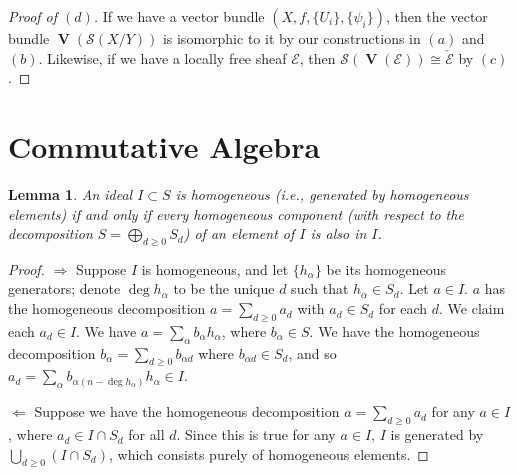 \documentclass[12pt,letterpaper]{article}
\newtheorem{lemma}{Lemma}[section]
\theoremstyle{definition}
\theoremstyle{remark}
\numberwithin{equation}{section}
\numberwithin{figure}{problem}
\DeclareMathOperator{\V}{\mathbf{V}}
\newcommand{\EE}{\mathscr{E}}
\newcommand{\Ss}{\mathscr{S}}
\begin{document}
\begin{proof}[Proof of $(d)$]
  If we have a vector bundle $(X,f,\{U_i\},\{\psi_i\})$, then the vector bundle $\V(\Ss(X/Y))$ is isomorphic to it by our constructions in $(a)$ and $(b)$. Likewise, if we have a locally free sheaf $\EE$, then $\Ss(\V(\EE)) \cong \check{\EE}$ by $(c)$.
\end{proof}

\appendix
\section{Commutative Algebra}
\begin{lemma}\label{homoglem}
  An ideal $I \subset S$ is homogeneous (i.e., generated by homogeneous elements) if and only if every homogeneous component (with respect to the decomposition $S = \bigoplus_{d \ge 0} S_d$) of an element of $I$ is also in $I$.
\end{lemma}
\begin{proof}
  $\Rightarrow$ Suppose $I$ is homogeneous, and let $\{h_\alpha\}$ be its homogeneous generators; denote $\deg h_\alpha$ to be the unique $d$ such that $h_\alpha \in S_d$. Let $a \in I$. $a$ has the homogeneous decomposition $a = \sum_{d \ge 0} a_d$ with $a_d \in S_d$ for each $d$. We claim each $a_d \in I$. We have $a = \sum_\alpha b_\alpha h_\alpha$, where $b_\alpha \in S$. We have the homogeneous decomposition $b_\alpha = \sum_{d \ge 0} b_{\alpha d}$ where $b_{\alpha d} \in S_d$, and so $a_d = \sum_\alpha b_{\alpha(n - \deg h_\alpha)}h_\alpha \in I$.
  \par $\Leftarrow$ Suppose we have the homogeneous decomposition $a = \sum_{d \ge 0} a_d$ for any $a \in I$, where $a_d \in I \cap S_d$ for all $d$. Since this is true for any $a \in I$, $I$ is generated by $\bigcup_{d \ge 0} (I \cap S_d)$, which consists purely of homogeneous elements.
\end{proof}
\end{document}
